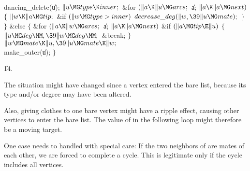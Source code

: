 \\{dancing\_delete}(\|u);\6
${}\|u\MG\\{type}\K\\{inner};{}$\6
\&{for} ${}(\|a\K\|u\MG\\{arcs};{}$ \|a; ${}\|a\K\|a\MG\\{next}){}$\5
${}\{{}$\1\6
${}\|w\K\|a\MG\\{tip};{}$\6
\&{if} ${}(\|w\MG\\{type}>\\{inner}){}$\1\5
${}\\{decrease\_deg}(\|w,\39\|u\MG\\{mate});{}$\2\6
\4${}\}{}$\2\6
\4${}\}{}$\5
\2\&{else}\5
${}\{{}$\1\6
\&{for} ${}(\|a\K\|w\MG\\{arcs};{}$ \|a; ${}\|a\K\|a\MG\\{next}){}$\1\6
\&{if} ${}(\|a\MG\\{tip}\E\|u){}$\5
${}\{{}$\1\6
${}\|u\MG\\{deg}\MM,\39\|w\MG\\{deg}\MM;{}$\6
\&{break};\6
\4${}\}{}$\2\2\6
${}\|w\MG\\{mate}\K\|u,\39\|u\MG\\{mate}\K\|w;{}$\6
\\{make\_outer}(\|u);\6
\4${}\}{}$\2\par
\U14.\fi

The situation might have changed since a vertex entered
the bare list,
because its type and/or degree may have been altered.

Also, giving clothes to one bare vertex might have a ripple effect, causing
other vertices to enter the bare list. The value of  in the
following
loop might therefore be a moving target.

One case needs to handled with special care: If the two neighbors of 
are mates of each other, we are forced to complete a cycle. This is
legitimate only if the cycle includes all vertices.

